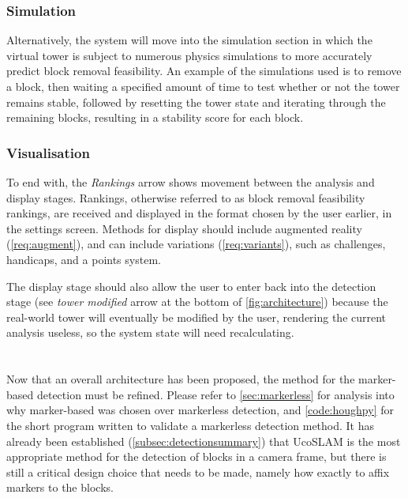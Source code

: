 \subsubsection{Simulation}

Alternatively, the system will move into the simulation section in which the virtual tower is subject to numerous physics simulations to more accurately predict block removal feasibility. An example of the simulations used is to remove a block, then waiting a specified amount of time to test whether or not the tower remains stable, followed by resetting the tower state and iterating through the remaining blocks, resulting in a stability score for each block.

\subsubsection{Visualisation}

To end with, the \textit{Rankings} arrow shows movement between the analysis and display stages. Rankings, otherwise referred to as block removal feasibility rankings, are received and displayed in the format chosen by the user earlier, in the settings screen. Methods for display should include augmented reality (\cref{req:augment}), and can include \jenga{} variations (\cref{req:variants}), such as challenges, handicaps, and a points system.

The display stage should also allow the user to enter back into the detection stage (see \textit{tower modified} arrow at the bottom of \cref{fig:architecture}) because the real-world tower will eventually be modified by the user, rendering the current analysis useless, so the system state will need recalculating.

\section{\detection}\label{sec:des:detection}

Now that an overall architecture has been proposed, the method for the marker-based detection must be refined. Please refer to \cref{sec:markerless} for analysis into why marker-based was chosen over markerless detection, and \cref{code:houghpy} for the short program written to validate a markerless detection method. It has already been established (\cref{subsec:detectionsummary}) that UcoSLAM is the most appropriate method for the detection of blocks in a camera frame, but there is still a critical design choice that needs to be made, namely how exactly to affix markers to the blocks.

